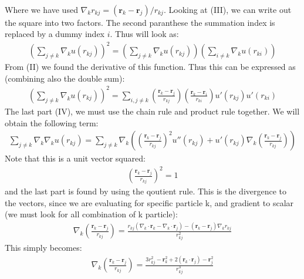 \documentclass[a4paper, 10pt]{article}
\begin{document}
\begin{appendices}
\begin{align*}
		\end{align*}
		Where we have used $\nabla_{k} r_{kj} = (\boldsymbol{r}_{k} - \boldsymbol{r}_{j})/r_{kj}$.
		Looking at (III), we can write out the square into two factors. The second paranthese the summation index is replaced by a
		dummy index $i$. Thus will look as:
		\begin{align}
		\left(\sum_{j\neq k}\nabla_{k} u(r_{kj})\right)^2 = \left(\sum_{j\neq k}\nabla_{k} u(r_{kj})\right)\left(\sum_{i\neq k}\nabla_{k} u(r_{ki})\right)
		\end{align}
		From (II) we found the derivative of this function. Thus this can be expressed as (combining also the double sum):
		\begin{align}
		\left(\sum_{j\neq k}\nabla_{k} u(r_{kj})\right)^2 =
		\sum_{i, j\neq k}\left(\frac{\boldsymbol{r}_{k} - \boldsymbol{r}_{j}}{r_{kj}}\right)
		\left(\frac{\boldsymbol{r}_{k} - \boldsymbol{r}_{i}}{r_{ki}}\right)u'(r_{kj})u'(r_{ki})
		\end{align}
		The last part (IV), we must use the chain rule and product rule together. We will obtain
		the following term:
		\begin{align}
		\sum_{j \neq k}\nabla_{k}\nabla_{k}u(r_{kj}) =
		\sum_{j \neq k}\nabla_{k}\left(
		\left(\frac{\boldsymbol{r}_{k} - \boldsymbol{r}_{j}}{r_{kj}}\right)^2 u''(r_{kj}) + u'(r_{kj})\nabla_{k}
		\left(\frac{\boldsymbol{r}_{k} - \boldsymbol{r}_{j}}{r_{kj}}\right)\right)
		\end{align}
		Note that this is a unit vector squared:
		\begin{align}
		\left(\frac{\boldsymbol{r}_{k} - \boldsymbol{r}_{j}}{r_{kj}}\right)^2 = 1
		\end{align}
		and the last part is found by using the qoutient rule. This is the divergence to the vectors, since we are evaluating for
		specific particle k, and gradient to scalar (we must look for all combination of k particle):
		\begin{align}
		\nabla_{k}
		\left(\frac{\boldsymbol{r}_{k} - \boldsymbol{r}_{j}}{r_{kj}}\right)
		= \frac{r_{kj}\left(\nabla_{k}\cdot\boldsymbol{r}_{k}-
			\nabla_{k}\cdot\boldsymbol{r}_{j}\right) -
			(\boldsymbol{r}_{k}-\boldsymbol{r}_{j})\nabla_{k}r_{kj}}{r_{kj}^2}
		\end{align}
		This simply becomes:
		\begin{align}
		\nabla_{k}
		\left(\frac{\boldsymbol{r}_{k} - \boldsymbol{r}_{j}}{r_{kj}}\right)
		= \frac{3r_{kj}^2 - \boldsymbol{r}^2_{k} + 2(\boldsymbol{r}_{k}\cdot \boldsymbol{r}_{j}) - \boldsymbol{r}^2_{j}}{r_{kj}^3}

\end{align}
\end{appendices}
\end{document}
